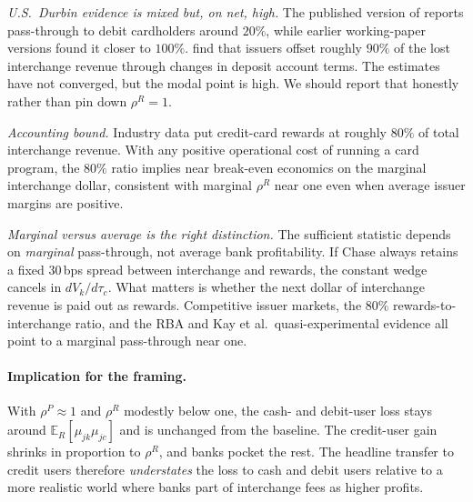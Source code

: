 \documentclass[11pt]{article}
\begin{document}
\textit{U.S.\ Durbin evidence is mixed but, on net, high.}
The published version of \citet{Mukharlyamov.Sarin2025} reports pass-through to debit cardholders around $20\%$, while earlier working-paper versions found it closer to $100\%$.
\citet{Kay.etal2018} find that issuers offset roughly $90\%$ of the lost interchange revenue through changes in deposit account terms.
The estimates have not converged, but the modal point is high.
We should report that honestly rather than pin down $\rho^R = 1$.

\textit{Accounting bound.}
Industry data put credit-card rewards at roughly $80\%$ of total interchange revenue.
With any positive operational cost of running a card program, the $80\%$ ratio implies near break-even economics on the marginal interchange dollar, consistent with marginal $\rho^R$ near one even when average issuer margins are positive.

\textit{Marginal versus average is the right distinction.}
The sufficient statistic depends on \emph{marginal} pass-through, not average bank profitability.
If Chase always retains a fixed $30$\,bps spread between interchange and rewards, the constant wedge cancels in $dV_k/d\tau_c$.
What matters is whether the next dollar of interchange revenue is paid out as rewards.
Competitive issuer markets, the $80\%$ rewards-to-interchange ratio, and the RBA and Kay et al.\ quasi-experimental evidence all point to a marginal pass-through near one.

\paragraph{Implication for the framing.}
With $\rho^P \approx 1$ and $\rho^R$ modestly below one, the cash- and debit-user loss stays around $\mathbb{E}_R[\mu_{jk}\mu_{jc}]$ and is unchanged from the baseline.
The credit-user gain shrinks in proportion to $\rho^R$, and banks pocket the rest.
The headline transfer to credit users therefore \emph{understates} the loss to cash and debit users relative to a more realistic world where banks part of interchange fees as higher profits.
\end{document}
